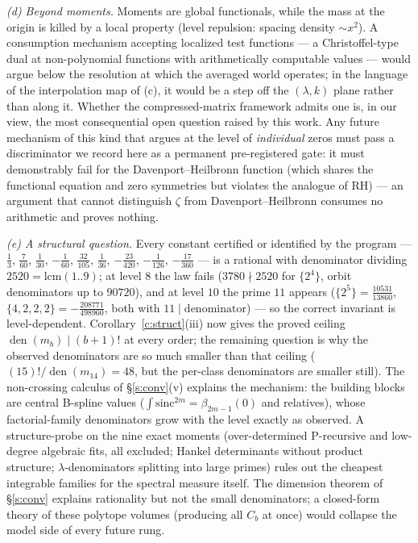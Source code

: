 \documentclass[11pt]{article}
\numberwithin{equation}{section}
\theoremstyle{definition}
\theoremstyle{remark}
\begin{document}
\emph{(d) Beyond moments.} Moments are global functionals,
while the mass at the origin is killed by a local property
(level repulsion: spacing density $\sim x^{2}$). A
consumption mechanism accepting localized test functions ---
a Christoffel-type dual at non-polynomial functions with
arithmetically computable values --- would argue below the
resolution at which the averaged world operates; in the
language of the interpolation map of (c), it would be a
step off the $(\lambda,k)$ plane rather than along it.
Whether the compressed-matrix
framework admits one is, in our view, the most consequential
open question raised by this work. Any future mechanism of
this kind that argues at the level of \emph{individual} zeros
must pass a discriminator we record here as a permanent
pre-registered gate: it must demonstrably fail for the
Davenport--Heilbronn function (which shares the functional
equation and zero symmetries but violates the analogue of RH)
--- an argument that cannot distinguish $\zeta$ from
Davenport--Heilbronn consumes no arithmetic and proves
nothing.

\emph{(e) A structural question.} Every constant certified or
identified by the program --- $\tfrac13$, $\tfrac7{60}$, $\tfrac1{30}$,
$-\tfrac1{60}$, $\tfrac{32}{105}$, $\tfrac1{36}$,
$-\tfrac{23}{420}$, $-\tfrac1{126}$, $-\tfrac{17}{360}$ ---
is a rational with denominator dividing
$2520=\mathrm{lcm}(1..9)$; at level $8$ the law fails
($3780\nmid2520$ for $\{2^4\}$, orbit denominators up to
$90720$), and at level $10$ the prime $11$ appears
($\{2^5\}=\tfrac{10531}{13860}$,
$\{4,2,2,2\}=-\tfrac{208771}{498960}$, both with
$11\mid\mathrm{denominator}$) --- so the correct invariant is
level-dependent. Corollary~\ref{c:struct}(iii) now gives the
proved ceiling $\operatorname{den}(m_b)\mid(b{+}1)!$ at every
order; the remaining question is why the observed
denominators are so much smaller than that ceiling
($(15)!/\operatorname{den}(m_{14})=48$, but the per-class
denominators are smaller still). The non-crossing calculus
of \S\ref{s:conv}(v) explains the mechanism: the building
blocks are central B-spline values
($\int\mathrm{sinc}^{2m}=\beta_{2m-1}(0)$ and relatives),
whose factorial-family denominators grow with the level
exactly as observed. A structure-probe on the
nine exact moments (over-determined P-recursive and
low-degree algebraic fits, all excluded; Hankel determinants
without product structure; $\lambda$-denominators splitting
into large primes) rules out the cheapest integrable families
for the spectral measure itself. The dimension theorem of
\S\ref{s:conv} explains rationality but not the small
denominators; a closed-form theory of these polytope volumes
(producing all $C_b$ at once) would collapse the model side of
every future rung.
\end{document}
